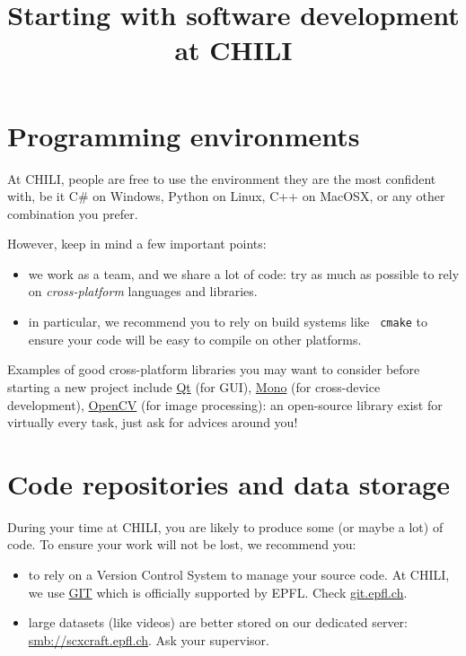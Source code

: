 \documentclass[a4paper,10pt]{article}
\title{
    Starting with software development at CHILI
}
\author{}
\begin{document}
\maketitle

\section*{Programming environments}

At CHILI, people are free to use the environment they are the most confident
with, be it C\# on Windows, Python on Linux, C++ on MacOSX, or any other
combination you prefer.

However, keep in mind a few important points:

\begin{itemize}

    \item we work as a team, and we share a lot of code: try as much as
        possible to rely on \emph{cross-platform} languages and libraries.

    \item in particular, we recommend you to rely on build systems like {\tt
        cmake} to ensure your code will be easy to compile on other platforms.

\end{itemize}

Examples of good cross-platform libraries you may want to consider before
starting a new project include \href{http://qt-project.org/}{Qt} (for GUI),
\href{http://www.mono-project.com}{Mono} (for cross-device development),
\href{http://opencv.org/}{OpenCV} (for image processing): an open-source
library exist for virtually every task, just ask for advices around you!

\section*{Code repositories and data storage}

During your time at CHILI, you are likely to produce some (or maybe a lot) of
code. To ensure your work will not be lost, we recommend you:


\begin{itemize}

    \item to rely on a Version Control System to manage your source code. At
        CHILI, we use \href{http://git-scm.org}{GIT} which is officially
        supported by EPFL. Check \url{git.epfl.ch}.

    \item large datasets (like videos) are better stored on our dedicated
        server: \url{smb://scxcraft.epfl.ch}. Ask your supervisor.

\end{itemize}

\vfill
{}

\end{document}
